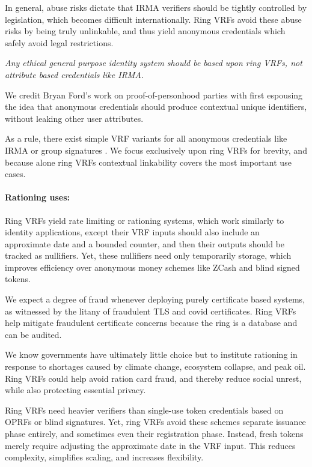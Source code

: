 In general, abuse risks dictate that IRMA verifiers should be tightly
controlled by legislation, which becomes difficult internationally. 
%
Ring VRFs avoid these abuse risks by being truly unlinkable, and thus
yield anonymous credentials which safely avoid legal restrictions.

{\it Any ethical general purpose identity system should be based
upon ring VRFs, not attribute based credentials like IRMA.}

We credit Bryan Ford's work on proof-of-personhood parties \cite{pop2008,pop2017}
with first espousing the idea that anonymous credentials should produce
contextual unique identifiers, without leaking other user attributes.

As a rule, there exist simple VRF variants for all anonymous credentials
like IRMA \cite{IRMAcredentials} or group signatures \cite{group_sig_survey}.
We focus exclusively upon ring VRFs for brevity, and because alone
ring VRFs contextual linkability covers the most important use cases.

\paragraph{Rationing uses:}

Ring VRFs yield rate limiting or rationing systems, which work
similarly to identity applications, except their VRF inputs should also
include an approximate date and a bounded counter, and
 then their outputs should be tracked as nullifiers.
Yet, these nullifiers need only temporarily storage, which improves 
efficiency over anonymous money schemes like ZCash and blind signed tokens.

We expect a degree of fraud whenever deploying purely certificate
based systems, as witnessed by the litany of fraudulent TLS and covid
certificates.  Ring VRFs help mitigate fraudulent certificate concerns
because the ring is a database and can be audited.

We know governments have ultimately little choice but to institute
rationing in response to shortages caused by climate change, ecosystem
collapse, and peak oil.  Ring VRFs could help avoid ration card fraud,
and thereby reduce social unrest, while also protecting essential privacy.

Ring VRFs need heavier verifiers than single-use token credentials
based on OPRFs \cite{PrivacyPass} or blind signatures.
Yet, ring VRFs avoid these schemes separate issuance phase entirely,
and sometimes even their registration phase.  Instead, fresh tokens
merely require adjusting the approximate date in the VRF input.
This reduces complexity, simplifies scaling, and increases flexibility.

